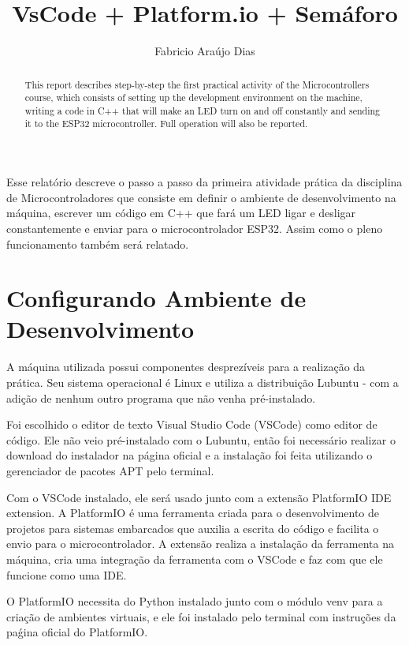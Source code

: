 \documentclass[12pt]{article}
\title{VsCode + Platform.io + Semáforo}
\author{Fabricio Araújo Dias}
\begin{document}
 

\maketitle

\begin{abstract}
  This report describes step-by-step the first practical activity of the Microcontrollers course, which consists of setting up the development environment on the machine, writing a code in C++ that will make an LED turn on and off constantly and sending it to the ESP32 microcontroller. Full operation will also be reported.
\end{abstract}
     
\begin{resumo} 
  Esse relatório descreve o passo a passo da primeira atividade prática da disciplina de Microcontroladores que consiste em definir o ambiente de desenvolvimento na máquina, escrever um código em C++ que fará um LED ligar e desligar constantemente e enviar para o microcontrolador ESP32. Assim como o pleno funcionamento também será relatado.
\end{resumo}


\section{Configurando Ambiente de Desenvolvimento}

A máquina utilizada possui componentes desprezíveis para a realização da prática. Seu sistema operacional é Linux e utiliza a distribuição Lubuntu - com a adição de nenhum outro programa que não venha pré-instalado. 

Foi escolhido o editor de texto Visual Studio Code (VSCode) como editor de código. Ele não veio pré-instalado com o Lubuntu, então foi necessário realizar o download do instalador na página oficial e a instalação foi feita utilizando o gerenciador de pacotes APT pelo terminal.

Com o VSCode instalado, ele será usado junto com a extensão PlatformIO IDE extension. A PlatformIO é uma ferramenta criada para o desenvolvimento de projetos para sistemas embarcados que auxilia a escrita do código e facilita o envio para o microcontrolador. A extensão realiza a instalação da ferramenta na máquina, cria uma integração da ferramenta com o VSCode e faz com que ele funcione como uma IDE.

O PlatformIO necessita do Python instalado junto com o módulo venv para a criação de ambientes virtuais, e ele foi instalado pelo terminal com instruções da paǵina oficial do PlatformIO.
\end{document}

